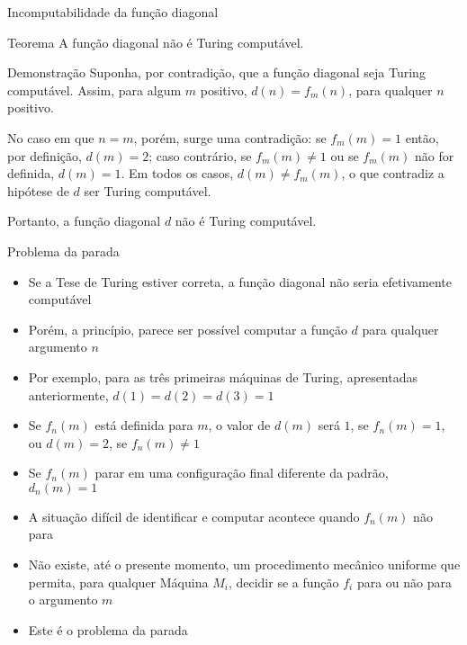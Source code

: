 \begin{frame}[fragile]{Incomputabilidade da função diagonal}

    \begin{block}{Teorema}
        A função diagonal não é Turing computável.
    \end{block}

    \begin{block}{Demonstração}
        Suponha, por contradição, que a função diagonal seja Turing computável. Assim, para algum
        $m$ positivo, $d(n) = f_m(n)$, para qualquer $n$ positivo. 

        \vspace{0.1in}

        No caso em que $n = m$, porém, surge uma contradição: se $f_m(m) = 1$ então, por definição,
        $d(m) = 2$; caso contrário, se $f_m(m)\neq 1$ ou se $f_m(m)$ não for definida, $d(m) = 1$.
        Em todos os casos, $d(m) \neq f_m(m)$, o que contradiz a hipótese de $d$ ser Turing
        computável.
     
        \vspace{0.1in}

        Portanto, a função diagonal $d$ não é Turing computável.
    \end{block}

\end{frame}

\begin{frame}[fragile]{Problema da parada}

    \begin{itemize}
        \item Se a Tese de Turing estiver correta, a função diagonal não seria efetivamente 
            computável

        \item Porém, a princípio, parece ser possível computar a função $d$ para qualquer
            argumento $n$

        \item Por exemplo, para as três primeiras máquinas de Turing, apresentadas anteriormente,
            $d(1) = d(2) = d(3) = 1$

        \item Se $f_n(m)$ está definida para $m$, o valor de $d(m)$ será $1$, se $f_n(m) = 1$, ou
            $d(m) = 2$, se $f_n(m) \neq 1$

        \item Se $f_n(m)$ parar em uma configuração final diferente da padrão, $d_n(m) = 1$

        \item A situação difícil de identificar e computar acontece quando $f_n(m)$ não para

        \item Não existe, até o presente momento, um procedimento mecânico uniforme que permita,
            para qualquer Máquina $M_i$, decidir se a função $f_i$ para ou não para o argumento
        $m$

        \item Este é o problema da parada
    \end{itemize}

\end{frame}

